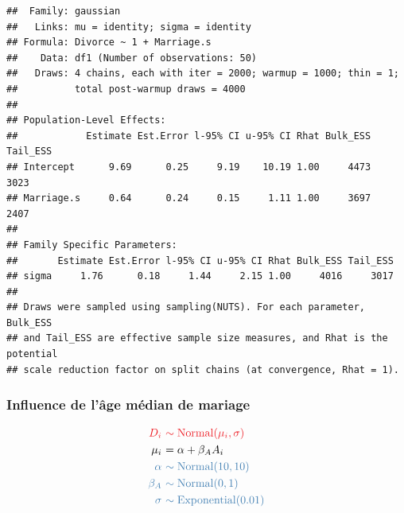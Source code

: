 \documentclass[
  a4paper,11pt,twoside,onecolumn,openright,final,oldfontcommands]{memoir}
\theoremstyle{definition}
\theoremstyle{definition}
\theoremstyle{definition}
\theoremstyle{definition}
\theoremstyle{remark}
\begin{document}
\begin{verbatim}
##  Family: gaussian 
##   Links: mu = identity; sigma = identity 
## Formula: Divorce ~ 1 + Marriage.s 
##    Data: df1 (Number of observations: 50) 
##   Draws: 4 chains, each with iter = 2000; warmup = 1000; thin = 1;
##          total post-warmup draws = 4000
## 
## Population-Level Effects: 
##            Estimate Est.Error l-95% CI u-95% CI Rhat Bulk_ESS Tail_ESS
## Intercept      9.69      0.25     9.19    10.19 1.00     4473     3023
## Marriage.s     0.64      0.24     0.15     1.11 1.00     3697     2407
## 
## Family Specific Parameters: 
##       Estimate Est.Error l-95% CI u-95% CI Rhat Bulk_ESS Tail_ESS
## sigma     1.76      0.18     1.44     2.15 1.00     4016     3017
## 
## Draws were sampled using sampling(NUTS). For each parameter, Bulk_ESS
## and Tail_ESS are effective sample size measures, and Rhat is the potential
## scale reduction factor on split chains (at convergence, Rhat = 1).
\end{verbatim}

\hypertarget{influence-de-luxe2ge-muxe9dian-de-mariage}{%
\subsubsection{Influence de l'âge médian de mariage}\label{influence-de-luxe2ge-muxe9dian-de-mariage}}

\[
\begin{aligned}
\color{orangered}{D_{i}} \ &\color{orangered}{\sim \mathrm{Normal}(\mu_{i}, \sigma)} \\
\color{black}{\mu_{i}} \ &\color{black}{= \alpha + \beta_{A} A_{i}} \\
\color{steelblue}{\alpha} \ &\color{steelblue}{\sim \mathrm{Normal}(10, 10)} \\
\color{steelblue}{\beta_{A}} \ &\color{steelblue}{\sim \mathrm{Normal}(0, 1)} \\
\color{steelblue}{\sigma} \ &\color{steelblue}{\sim \mathrm{Exponential}(0.01)} \\
\end{aligned}
\]
\end{document}
